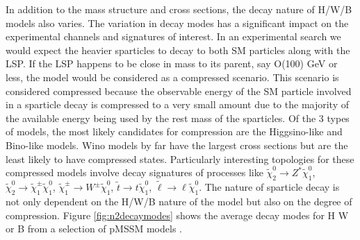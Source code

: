 

In addition to the mass structure and cross sections, the decay nature of H/W/B models also varies. The variation in decay modes has a significant impact on the experimental channels and signatures of interest. In an experimental search we would expect the heavier sparticles to decay to both SM particles along with the LSP. If the LSP happens to be close in mass to its parent, say O(100) GeV or less, the model would be considered as a compressed scenario. This scenario is considered compressed because the observable energy of the SM particle involved in a sparticle decay is compressed to a very small amount due to the majority of the available energy being used by the rest mass of the sparticles. Of the 3 types of models, the most likely candidates for compression are the Higgsino-like and Bino-like models. Wino models by far have the largest cross sections but are the least likely to have compressed states. Particularly interesting topologies for these compressed models involve decay signatures of processes like $\tilde{\chi}^0_2 \rightarrow Z^*\tilde{\chi}^0_1 $, $\tilde{\chi}^0_2\rightarrow \tilde{\chi}^\pm_1 \tilde{\chi}^0_1 $, $\tilde{\chi}^\pm_1\rightarrow W^\pm \tilde{\chi}^0_1$, $\tilde{t}\rightarrow t \tilde{\chi}^0_1$, $\tilde{\ell}\rightarrow\ell \tilde{\chi}^0_1$. The nature of sparticle decay is not only dependent on the H/W/B nature of the model but also on the degree of compression. Figure \ref{fig:n2decaymodes} shows the average decay modes for H W or B from a selection of pMSSM models \cite{ATLAS:2015wrn}.



